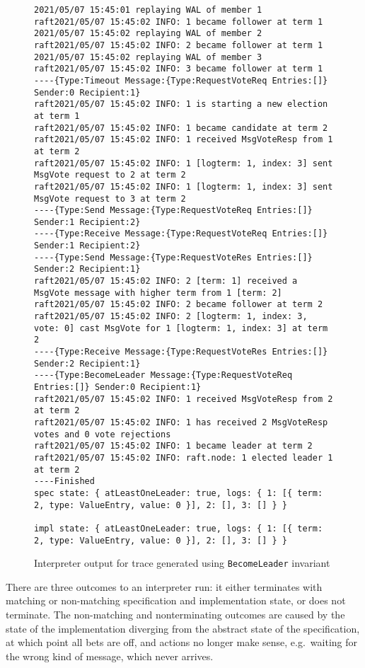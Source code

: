 \documentclass[a4paper]{article}
\begin{document}
\begin{figure}
\centering
\begin{lstlisting}[breaklines=true,basicstyle=\ttfamily]
2021/05/07 15:45:01 replaying WAL of member 1
raft2021/05/07 15:45:02 INFO: 1 became follower at term 1
2021/05/07 15:45:02 replaying WAL of member 2
raft2021/05/07 15:45:02 INFO: 2 became follower at term 1
2021/05/07 15:45:02 replaying WAL of member 3
raft2021/05/07 15:45:02 INFO: 3 became follower at term 1
----{Type:Timeout Message:{Type:RequestVoteReq Entries:[]} Sender:0 Recipient:1}
raft2021/05/07 15:45:02 INFO: 1 is starting a new election at term 1
raft2021/05/07 15:45:02 INFO: 1 became candidate at term 2
raft2021/05/07 15:45:02 INFO: 1 received MsgVoteResp from 1 at term 2
raft2021/05/07 15:45:02 INFO: 1 [logterm: 1, index: 3] sent MsgVote request to 2 at term 2
raft2021/05/07 15:45:02 INFO: 1 [logterm: 1, index: 3] sent MsgVote request to 3 at term 2
----{Type:Send Message:{Type:RequestVoteReq Entries:[]} Sender:1 Recipient:2}
----{Type:Receive Message:{Type:RequestVoteReq Entries:[]} Sender:1 Recipient:2}
----{Type:Send Message:{Type:RequestVoteRes Entries:[]} Sender:2 Recipient:1}
raft2021/05/07 15:45:02 INFO: 2 [term: 1] received a MsgVote message with higher term from 1 [term: 2]
raft2021/05/07 15:45:02 INFO: 2 became follower at term 2
raft2021/05/07 15:45:02 INFO: 2 [logterm: 1, index: 3, vote: 0] cast MsgVote for 1 [logterm: 1, index: 3] at term 2
----{Type:Receive Message:{Type:RequestVoteRes Entries:[]} Sender:2 Recipient:1}
----{Type:BecomeLeader Message:{Type:RequestVoteReq Entries:[]} Sender:0 Recipient:1}
raft2021/05/07 15:45:02 INFO: 1 received MsgVoteResp from 2 at term 2
raft2021/05/07 15:45:02 INFO: 1 has received 2 MsgVoteResp votes and 0 vote rejections
raft2021/05/07 15:45:02 INFO: 1 became leader at term 2
raft2021/05/07 15:45:02 INFO: raft.node: 1 elected leader 1 at term 2
----Finished
spec state: { atLeastOneLeader: true, logs: { 1: [{ term: 2, type: ValueEntry, value: 0 }], 2: [], 3: [] } }

impl state: { atLeastOneLeader: true, logs: { 1: [{ term: 2, type: ValueEntry, value: 0 }], 2: [], 3: [] } }
\end{lstlisting}
\caption{Interpreter output for trace generated using \texttt{BecomeLeader} invariant}
\label{fig:output}
\end{figure}

There are three outcomes to an interpreter run: it either terminates with matching or non-matching specification and implementation state, or does not terminate.
%
The non-matching and nonterminating outcomes are caused by the state of the implementation diverging from the abstract state of the specification, at which point all bets are off, and actions no longer make sense, e.g.~waiting for the wrong kind of message, which never arrives.
\end{document}
